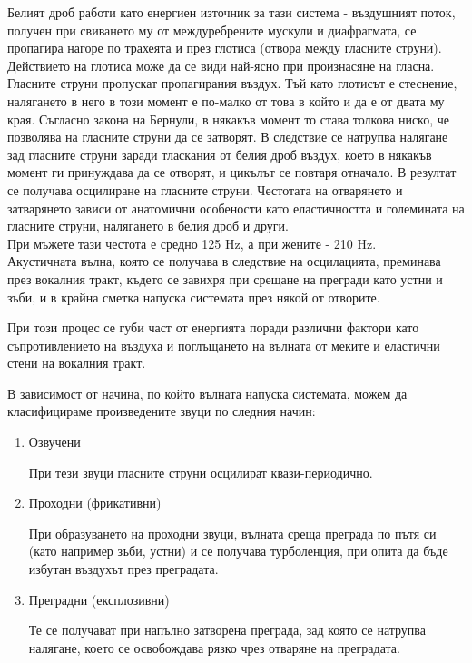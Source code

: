 \documentclass[main.tex]{subfiles}
\begin{document}
    Белият дроб работи като енергиен източник за тази система - въздушният поток, получен при свиването му от междуребрените мускули и диафрагмата,
    се пропагира нагоре по трахеята и през глотиса (отвора между гласните струни).\\
    Действието на глотиса може да се види най-ясно при произнасяне на гласна. Гласните струни пропускат пропагирания въздух. Тъй като глотисът е стеснение, налягането в него в този момент е по-малко от това в който и да е от двата му края. Съгласно закона на Бернули, в някакъв момент то става толкова ниско, че позволява на гласните струни да се затворят. В следствие се натрупва налягане зад гласните струни заради тласкания от белия дроб въздух, което в някакъв момент ги принуждава да се отворят, и цикълът се повтаря отначало. В резултат се получава осцилиране на гласните струни. Честотата на отварянето и затварянето зависи от анатомични особености като еластичността и големината на гласните струни, налягането в белия дроб и други.\\
    При мъжете тази честота е средно 125 Hz, а при жените - 210 Hz.\\
    Акустичната вълна, която се получава в следствие на осцилацията,
    преминава през вокалния тракт, където се завихря при срещане на прегради като устни и зъби, и в крайна сметка напуска системата през някой от отворите.

    При този процес се губи част от енергията поради различни фактори като съпротивлението на въздуха и поглъщането на вълната от меките и еластични стени на вокалния тракт.

    В зависимост от начина, по който вълната напуска системата, можем да класифицираме произведените звуци по следния начин:

    \begin{enumerate}
        \item Озвучени

        При тези звуци гласните струни осцилират квази-периодично.
        
        \item Проходни (фрикативни) 
        
        При образуването на проходни звуци, вълната среща преграда по пътя си
        (като например зъби, устни) и се получава турболенция, при опита да бъде избутан въздухът през преградата.
        
        \item Преградни (експлозивни)
        
        Те се получават при напълно затворена преграда, зад която се натрупва налягане, което се освобождава рязко чрез отваряне на преградата.
    \end{enumerate}
    
\end{document}
